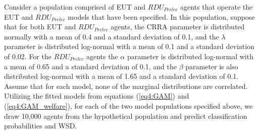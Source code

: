\documentclass[../main.tex]{subfiles}
\begin{document}
Consider a population comprised of EUT and $\mathit{RDU_{Prelec}}$ agents that operate the EUT and $\mathit{RDU_{Prelec}}$ models that have been specified.
In this population, suppose that for both EUT and $\mathit{RDU_{Prelec}}$ agents, the CRRA parameter is distributed normally with a mean of 0.4 and a standard deviation of 0.1, and the $\lambda$ parameter is distributed log-normal with a mean of 0.1 and a standard deviation of 0.02.
For the $\mathit{RDU_{Prelec}}$ agents the $\alpha$ parameter is distributed log-normal with a mean of 0.65 and a standard deviation of 0.1, and the $\beta$ parameter is also distributed log-normal with a mean of 1.65 and a standard deviation of 0.1.
Assume that for each model, none of the marginal distributions are correlated.
Utilizing the fitted models from equations (\ref{eq4:GAM}) and (\ref{eq4:GAM_welfare}), for each of the two model populations specified above, we draw 10,000 agents from the hypothetical population and predict classification probabilities and WSD.
\end{document}
